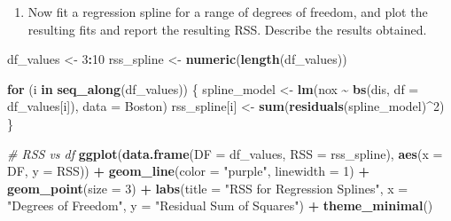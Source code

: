 \documentclass[
]{article}
\newenvironment{Shaded}{\begin{snugshade}}{\end{snugshade}}
\newcommand{\AttributeTok}[1]{\textcolor[rgb]{0.13,0.29,0.53}{#1}}
\newcommand{\CommentTok}[1]{\textcolor[rgb]{0.56,0.35,0.01}{\textit{#1}}}
\newcommand{\ControlFlowTok}[1]{\textcolor[rgb]{0.13,0.29,0.53}{\textbf{#1}}}
\newcommand{\DecValTok}[1]{\textcolor[rgb]{0.00,0.00,0.81}{#1}}
\newcommand{\FunctionTok}[1]{\textcolor[rgb]{0.13,0.29,0.53}{\textbf{#1}}}
\newcommand{\NormalTok}[1]{#1}
\newcommand{\OtherTok}[1]{\textcolor[rgb]{0.56,0.35,0.01}{#1}}
\newcommand{\SpecialCharTok}[1]{\textcolor[rgb]{0.81,0.36,0.00}{\textbf{#1}}}
\newcommand{\StringTok}[1]{\textcolor[rgb]{0.31,0.60,0.02}{#1}}
\providecommand{\tightlist}{%
  \setlength{\itemsep}{0pt}\setlength{\parskip}{0pt}}
\begin{document}
\begin{enumerate}
\def\labelenumi{(\alph{enumi})}
\setcounter{enumi}{4}
\tightlist
\item
  Now fit a regression spline for a range of degrees of freedom, and
  plot the resulting fits and report the resulting RSS. Describe the
  results obtained.
\end{enumerate}

\begin{Shaded}
\begin{Highlighting}[]
\NormalTok{df\_values }\OtherTok{\textless{}{-}} \DecValTok{3}\SpecialCharTok{:}\DecValTok{10}
\NormalTok{rss\_spline }\OtherTok{\textless{}{-}} \FunctionTok{numeric}\NormalTok{(}\FunctionTok{length}\NormalTok{(df\_values))}

\ControlFlowTok{for}\NormalTok{ (i }\ControlFlowTok{in} \FunctionTok{seq\_along}\NormalTok{(df\_values)) \{}
\NormalTok{  spline\_model }\OtherTok{\textless{}{-}} \FunctionTok{lm}\NormalTok{(nox }\SpecialCharTok{\textasciitilde{}} \FunctionTok{bs}\NormalTok{(dis, }\AttributeTok{df =}\NormalTok{ df\_values[i]), }\AttributeTok{data =}\NormalTok{ Boston)}
\NormalTok{  rss\_spline[i] }\OtherTok{\textless{}{-}} \FunctionTok{sum}\NormalTok{(}\FunctionTok{residuals}\NormalTok{(spline\_model)}\SpecialCharTok{\^{}}\DecValTok{2}\NormalTok{)}
\NormalTok{\}}

\CommentTok{\# RSS vs df}
\FunctionTok{ggplot}\NormalTok{(}\FunctionTok{data.frame}\NormalTok{(}\AttributeTok{DF =}\NormalTok{ df\_values, }\AttributeTok{RSS =}\NormalTok{ rss\_spline), }\FunctionTok{aes}\NormalTok{(}\AttributeTok{x =}\NormalTok{ DF, }\AttributeTok{y =}\NormalTok{ RSS)) }\SpecialCharTok{+}
  \FunctionTok{geom\_line}\NormalTok{(}\AttributeTok{color =} \StringTok{"purple"}\NormalTok{, }\AttributeTok{linewidth =} \DecValTok{1}\NormalTok{) }\SpecialCharTok{+}
  \FunctionTok{geom\_point}\NormalTok{(}\AttributeTok{size =} \DecValTok{3}\NormalTok{) }\SpecialCharTok{+}
  \FunctionTok{labs}\NormalTok{(}\AttributeTok{title =} \StringTok{"RSS for Regression Splines"}\NormalTok{,}
       \AttributeTok{x =} \StringTok{"Degrees of Freedom"}\NormalTok{,}
       \AttributeTok{y =} \StringTok{"Residual Sum of Squares"}\NormalTok{) }\SpecialCharTok{+}
  \FunctionTok{theme\_minimal}\NormalTok{()}
\end{Highlighting}
\end{Shaded}
\end{document}
